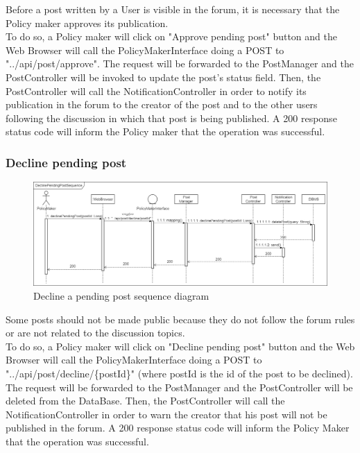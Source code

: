 Before a post written by a User is visible in the forum, it is necessary that the Policy maker approves its publication.\\ 
To do so, a Policy maker will click on "Approve pending post" button and the Web Browser will call the PolicyMakerInterface doing a POST to "../api/post/approve". The request will be forwarded to the PostManager and the PostController will be invoked to update the post's status field. Then, the PostController will call the NotificationController in order to notify its publication in the forum to the creator of the post and to the other users following the discussion in which that post is being published. A 200 response status code will inform the Policy maker that the operation was successful.

\subsubsection{Decline pending post}
\begin{figure}[h!]
        \centering
        \includegraphics[scale=0.27]{images/runtime_view/decline_pending_post_runtime_view_diagram.png}
        \caption{Decline a pending post sequence diagram}
        \label{fig:decline_pending_post_sequence_diagram}
\end{figure}
\FloatBarrier

Some posts should not be made public because they do not follow the forum rules or are not related to the discussion topics.\\ 
To do so, a Policy maker will click on "Decline pending post" button and the Web Browser will call the PolicyMakerInterface doing a POST to "../api/post/decline/\{postId\}" (where postId is the id of the post to be declined). The request will be forwarded to the PostManager and the PostController will be deleted from the DataBase. Then, the PostController will call the NotificationController in order to warn the creator that his post will not be published in the forum. A 200 response status code will inform the Policy Maker that the operation was successful.

